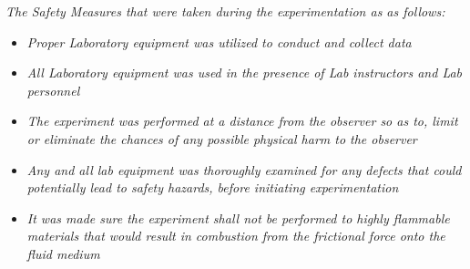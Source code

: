

\textit{The Safety Measures that were taken during the experimentation as as follows:}

	\begin{itemize}
		\item \textit{Proper Laboratory equipment was utilized to conduct and collect data}
		\item \textit{All Laboratory equipment was used in the presence of Lab instructors and Lab personnel}
		\item \textit{The experiment was performed at a distance from the observer so as to, limit or eliminate the chances of any possible physical harm to the observer}
		\item \textit{Any and all lab equipment was thoroughly examined for any defects that could potentially lead to safety hazards, before initiating experimentation}
		\item \textit{It was made sure the experiment shall not be performed to highly flammable materials that would result in combustion from the frictional force onto the fluid medium}
	\end{itemize}

